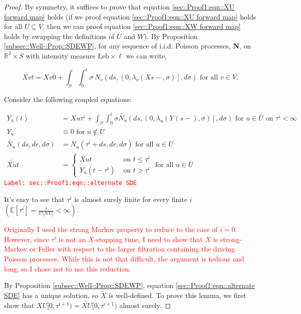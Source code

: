 \documentclass[12pt]{article}
\newcommand{\mb}{\mathbb}
\newcommand{\mc}{\mathcal}
\newcommand{\ov}{\overline}
\newcommand{\te}{\text}
\newcommand{\tr}{\textcolor{red}}
\newcommand{\labe}[1]{\tr{\texttt{Label: #1}}}
\newcommand{\ind}{\hspace{24pt}}
\newcommand{\ex}[1]{\mb{E}\left[#1\right]}			%
\newcommand{\neigh}{\mc{N}}					%
\renewcommand{\v}{v}							%
\newcommand{\vv}{u}								%
\renewcommand{\U}{U}							%
\newcommand{\UU}{W}								%
\renewcommand{\S}{S}							%
\newcommand{\s}{\sigma}							%
\renewcommand{\t}{t}							%
\renewcommand{\tt}{s}							%
\newcommand{\X}{X}								%
\newcommand{\cl}{\ov}							%
\newcommand{\poiss}[1]{N_{#1}}						%
\newcommand{\poisses}{\mathbf{N}}				%
\newcommand{\leb}{\te{Leb}}							%
\newcommand{\V}{V}									%
\renewcommand{\r}{r}								%
\newcommand{\rt}[1]{\tau^{#1}}						%
\newcommand{\itt}{i}								%
\newcommand{\rxvtt}[2]{Y_{#1}{(#2)}}				%
\newcommand{\rxvtts}[2]{Y_{#1}{#2}}					%
\newcommand{\rate}[1]{\lambda_{#1}}					%
\newcommand{\const}[1]{C_{#1}}						%
\newcommand{\Sm}{\ell}								%
\newcommand{\alt}{\widetilde}						%
\begin{document}
\begin{proof}
By symmetry, it suffices to prove that equation \ref{sec::Proof1:eqn::XU forward map} holds (if we proof equation \eqref{sec::Proof1:eqn::XU forward map} holds for all \(\U \subseteq \V\), then we can proof equation \eqref{sec::Proof1:eqn::XW forward map} holds by swapping the definitions of \(\U\) and \(\UU\)). By Proposition \ref{subsec::Well-:Prop::SDEWP}, for any sequence of i.i.d. Poisson processes, \(\poisses\), on \(\mb{R}^2\times \S\) with intensity measure \(\leb\times\Sm\) we can write,

\[\X{\v}{\t} = \X{\v}{0} + \int_\S\int_0^\t \s\,\poiss{\v}\left(d\tt,\left(0,\rate{\v}(\X{}{\tt-},\s)\right],d\s\right)\te{ for all } \v\in \V.\]

Consider the following coupled equations:

\begin{align}
\rxvtt{\vv}{\t} &= \X{\vv}{\rt{\itt}} + \int_\S\int_0^\t \s\alt{\poiss{\vv}}\left(d\tt,\left(0,\rate{\vv}(\rxvtt{}{\tt-},\s)\right],d\s\right)\te{ for } \vv \in \cl{\U} \te{ on } \rt{\itt} < \infty \label{sec::Proof1:eqn::alternate SDE}\\
\rxvtts{\vv}{} &\equiv 0\te{ for } \vv\notin \cl{\U}\nonumber\\
\alt{\poiss{\vv}}(d\tt,d\r,d\s) &= \poiss{\vv}(\rt{\itt} + d\tt,d\r,d\s) \te{ for all }\vv\in \cl{\U}\nonumber\\
\alt{\X{\vv}{\t}} &= \begin{cases}
\X{\vv}{\t} &\te{ on } \t \leq \rt{\itt}\\
\rxvtt{\vv}{\t - \rt{\itt}} &\te{ on } \t > \rt{\itt}
\end{cases} \te{ for all } \vv\in \cl{\U} \nonumber
\end{align}
\labe{sec::Proof1:eqn::alternate SDE}

It's easy to see that \(\rt{\itt}\) is almost surely finite for every finite \(\itt\) \(\left(\ex{\rt{\itt}} = \frac{\itt}{\const{}|\neigh{\U}|} < \infty\right)\). 

\ind \tr{Originally I used the strong Markov property to reduce to the case of \(\itt = 0\). However, since \(\rt{\itt}\) is not an \(\X{}{}\)-stopping time, I need to show that \(\X{}{}\) is strong-Markov or Feller with respect to the larger filtration containing the driving Poisson processes. While this is not that difficult, the argument is tedious and long, so I chose not to use this reduction.}

\ind By Proposition \ref{subsec::Well-:Prop::SDEWP}, equation \eqref{sec::Proof1:eqn::alternate SDE} has a unique solution, so \(\alt{\X{}{}}\) is well-defined. To prove this lemma, we first show that \(\X{\U}{[0,\rt{\itt+1})} = \alt{\X{\U}{}}{[0,\rt{\itt+1})}\) almost surely. 


\end{proof}
\end{document}
